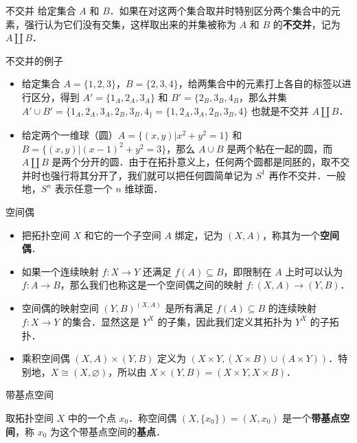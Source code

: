 

\begin{definition}{不交并}
给定集合 $A$ 和 $B$．如果在对这两个集合取并时特别区分两个集合中的元素，强行认为它们没有交集，这样取出来的并集被称为 $A$ 和 $B$ 的\textbf{不交并}，记为 $A\amalg B$．
\end{definition}

\begin{example}{不交并的例子}
\begin{itemize}
\item 给定集合 $A=\{1,2,3\}$，$B=\{2,3,4\}$，给两集合中的元素打上各自的标签以进行区分，得到 $A'=\{1_A, 2_A, 3_A\}$ 和 $B'=\{2_B, 3_B, 4_B$，那么并集 $A'\cup B'=\{1_A, 2_A, 3_A, 2_B, 3_B, 4_\}=\{1, 2_A, 3_A, 2_B, 3_B, 4\}$ 也就是不交并 $A\amalg B$．
\item 给定两个一维球（圆）$A=\{(x, y)|x^2+y^2=1\}$ 和 $B=\{(x, y)|(x-1)^2+y^2=3\}$，那么 $A\cup B$ 是两个粘在一起的圆，而 $A\amalg B$ 是两个分开的圆．由于在拓扑意义上，任何两个圆都是同胚的，取不交并时也强行将其分开了，我们就可以把任何圆简单记为 $S^1$ 再作不交并．一般地，$S^n$ 表示任意一个 $n$ 维球面．
\end{itemize}
\end{example}

\begin{definition}{空间偶}
\begin{itemize}
\item 把拓扑空间 $X$ 和它的一个子空间 $A$ 绑定，记为 $(X, A)$，称其为一个\textbf{空间偶}．
\item 如果一个连续映射 $f:X\rightarrow Y$ 还满足 $f(A)\subseteq B$，即限制在 $A$ 上时可以认为 $f:A\rightarrow B$，那么我们也称这是一个空间偶之间的映射 $f:(X, A)\rightarrow(Y, B)$．
\item 空间偶的映射空间 $(Y, B)^{(X, A)}$ 是所有满足 $f(A)\subseteq B$ 的连续映射 $f:X\rightarrow Y$ 的集合．显然这是 $Y^X$ 的子集，因此我们定义其拓扑为 $Y^X$ 的子拓扑．
\item 乘积空间偶 $(X, A)\times(Y,B)$ 定义为 $(X\times Y, (X\times B)\cup(A\times Y))$．特别地，$X\cong(X, \varnothing)$，所以由 $X\times(Y, B)=(X\times Y, X\times B)$．


\end{itemize}
\end{definition}

\begin{definition}{带基点空间}

取拓扑空间 $X$ 中的一个点 $x_0$．称空间偶 $(X, \{x_0\})=(X, x_0)$ 是一个\textbf{带基点空间}，称 $x_0$ 为这个带基点空间的\textbf{基点}．

\end{definition}

